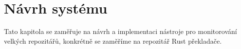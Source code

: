 
\chapter{Návrh systému}
\label{chap:design}
Tato kapitola se zaměřuje na návrh a implementaci nástroje pro monitorování velkých repozitářů, konkrétně se zaměříme na repozitář Rust překladače.





